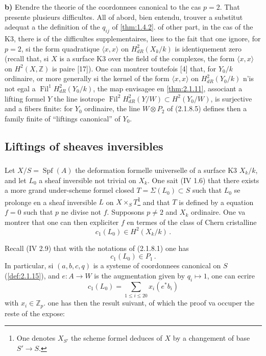 \documentclass[12pt,a4paper]{article}
\theoremstyle{plain}
\theoremstyle{definition}
\theoremstyle{remark}
\DeclareMathOperator{\Spf}{Spf}
\DeclareMathOperator{\Fil}{Fil}
\begin{document}
\textbf{b)} Etendre the theorie of the coordonnees canonical to the cas $p = 2$. That presente plusieurs difficultes. All of abord, bien entendu, trouver a substitut adequat a the definition of the $q_{ij}$ of \ref{thm:1.4.2}. of other part, in the cas of the K3, there is of the difficultes supplementaires, liees to the fait that one ignore, for $p = 2$, si the form quadratique $\langle x, x\rangle$ on $H_{dR}^2(X_k/k)$ is identiquement zero (recall that, si $X$ is a surface K3 over the field of the complexes, the form $\langle x, x\rangle$ on $H^2(X, \mathbb{Z})$ is paire [17]). One can montrer toutefois [4] that, for $Y_0/k$ ordinaire, or more generally si the kernel of the form $\langle x, x\rangle$ on $H_{dR}^2(Y_0/k)$ n'is not egal a $\Fil^1H_{dR}^2(Y_0/k)$, the map envisagee en \ref{thm:2.1.11}, associant a lifting formel $Y$ the line isotrope $\Fil^2H_{dR}^2(Y/W) \subset H^2(Y_0/W)$, is surjective and a fibers finite: for $Y_0$ ordinaire, the line $W \otimes P_2$ of (2.1.8.5) defines then a family finite of ``liftings canonical'' of $Y_0$.

\subsection{Liftings of sheaves inversibles}

\subsubsection{}

Let $X/S = \Spf(A)$ the deformation formelle universelle of a surface K3 $X_k/k$, and let $L_0$ a sheaf inversible not trivial on $X_k$. One sait (IV 1.6) that there exists a more grand under-scheme formel closed $T = \Sigma(L_0) \subset S$ such that $L_0$ se prolonge en a sheaf inversible $L$ on $X \times_S T$\footnote{One denotes $X_{S'}$ the scheme formel deduces of $X$ by a changement of base $S' \to S$.} and that $T$ is defined by a equation $f = 0$ such that $p$ ne divise not $f$. Supposons $p \neq 2$ and $X_k$ ordinaire. One va montrer that one can then expliciter $f$ en termes of the class of Chern cristalline
\begin{equation}\label{eq:2.2.1.1}
c_1(L_0) \in H^2(X_k/k)\,.\end{equation}

Recall (IV 2.9) that with the notations of (2.1.8.1) one has
\begin{equation}\label{eq:2.2.1.2}
c_1(L_0) \in P_1\,.\end{equation}
In particular, si $(a, b, c, q)$ is a systeme of coordonnees canonical on $S$ (\ref{def:2.1.15}), and $e : A \to W$ is the augmentation given by $q_i \mapsto 1$, one can ecrire
\begin{equation}\label{eq:2.2.1.3}
c_1(L_0) = \sum_{1 \leq i \leq 20} x_i (e^*b_i)\end{equation}
with $x_i \in \mathbb{Z}_p$. one has then the result suivant, of which the proof va occuper the reste of the expose:
\end{document}
